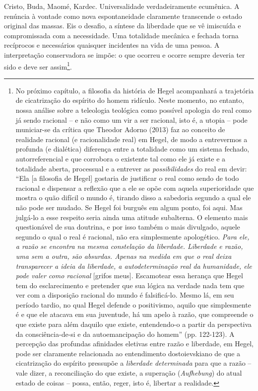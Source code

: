 Cristo, Buda, Maomé, Kardec. Universalidade verdadeiramente ecumênica. A
renúncia à vontade como nova espontaneidade claramente transcende o
estado original das massas. Eis o desafio, a síntese da liberdade que se
vê imiscuída e compromissada com a necessidade. Uma totalidade mecânica
e fechada torna recíprocos e necessários quaisquer incidentes na vida de
uma pessoa. A interpretação conservadora se impõe: o que ocorreu e
ocorre sempre deveria ter sido e deve ser assim\footnote{No próximo
  capítulo, a filosofia da história de Hegel acompanhará a trajetória de
  cicatrização do espírito do homem ridículo. Neste momento, no entanto,
  nossa análise sobre a teleologia teológica como possível apologia do
  real como já sendo racional -- e não como um vir a ser racional, isto
  é, a utopia -- pode municiar-se da crítica que Theodor Adorno (2013)
  faz ao conceito de realidade racional (e racionalidade real) em Hegel,
  de modo a entrevermos a profunda (e dialética) diferença entre a
  totalidade como um sistema fechado, autorreferencial e que corrobora o
  existente tal como ele já existe e a totalidade aberta, processual e a
  entrever as \emph{possibilidades} do real em devir: ``Ela {[}a
  filosofia de Hegel{]} gostaria de justificar o real como sendo de todo
  racional e dispensar a reflexão que a ele se opõe com aquela
  superioridade que mostra o quão difícil o mundo é, tirando disso a
  sabedoria segundo a qual ele não pode ser mudado. Se Hegel foi burguês
  em algum ponto, foi aqui. Mas julgá-lo a esse respeito seria ainda uma
  atitude subalterna. O elemento mais questionável de sua doutrina, e
  por isso também o mais divulgado, aquele segundo o qual o real é
  racional, não era simplesmente apologético. \emph{Para ele, a razão se
  encontra na mesma constelação da liberdade. Liberdade e razão, uma sem
  a outra, são absurdas. Apenas na medida em que o real deixa
  transparecer a ideia da liberdade, a autodeterminação real da
  humanidade, ele pode valer como racional} {[}grifos meus{]}.
  Escamotear essa herança que Hegel tem do esclarecimento e pretender
  que sua lógica na verdade nada tem que ver com a disposição racional
  do mundo é falsificá-lo. Mesmo lá, em seu período tardio, no qual
  Hegel defende o positivismo, aquilo que simplesmente é e que ele
  atacava em sua juventude, há um apelo à razão, que compreende o que
  existe para além daquilo que existe, entendendo-o a partir da
  perspectiva da consciência-de-si e da autoemancipação do homem'' (pp.
  122-123). A percepção das profundas afinidades eletivas entre razão e
  liberdade, em Hegel, pode ser claramente relacionada ao entendimento
  dostoievskiano de que a cicatrização do espírito pressupõe a
  \emph{liberdade determinada} para que a razão -- vale dizer, a
  reconciliação do que existe, a superação (\emph{Aufhebung}) do atual
  estado de coisas -- possa, então, reger, isto é, libertar a realidade.}.
